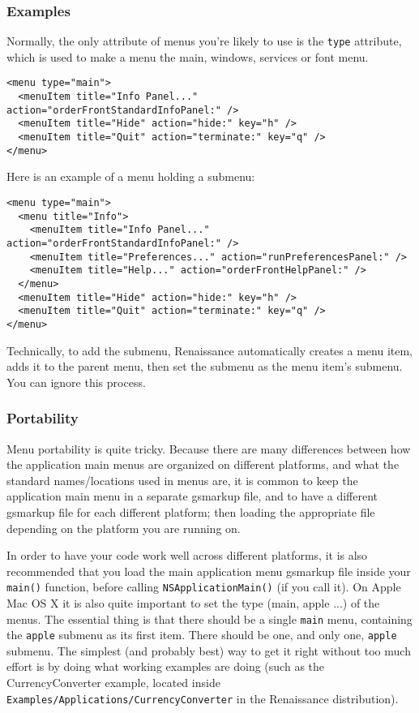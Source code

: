\subsubsection{Examples}
Normally, the only attribute of menus you're likely to use is the 
\texttt{type} attribute, which is used to make a menu the main, windows, 
services or font menu.
\begin{verbatim}
<menu type="main">
  <menuItem title="Info Panel..." action="orderFrontStandardInfoPanel:" />
  <menuItem title="Hide" action="hide:" key="h" />
  <menuItem title="Quit" action="terminate:" key="q" />
</menu>
\end{verbatim}

Here is an example of a menu holding a submenu:
\begin{verbatim}
<menu type="main">
  <menu title="Info">
    <menuItem title="Info Panel..." action="orderFrontStandardInfoPanel:" />
    <menuItem title="Preferences..." action="runPreferencesPanel:" />
    <menuItem title="Help..." action="orderFrontHelpPanel:" />
  </menu>
  <menuItem title="Hide" action="hide:" key="h" />
  <menuItem title="Quit" action="terminate:" key="q" />
</menu>
\end{verbatim}
Technically, to add the submenu, Renaissance automatically creates a
menu item, adds it to the parent menu, then set the submenu as the
menu item's submenu.  You can ignore this process.

\subsubsection{Portability}
Menu portability is quite tricky.  Because there are many differences
between how the application main menus are organized on different
platforms, and what the standard names/locations used in menus are, it
is common to keep the application main menu in a separate gsmarkup
file, and to have a different gsmarkup file for each different
platform; then loading the appropriate file depending on the platform
you are running on.

In order to have your code work well across different platforms, it is
also recommended that you load the main application menu gsmarkup file
inside your \texttt{main()} function, before calling
\texttt{NSApplicationMain()} (if you call it).  On Apple Mac OS X it is
also quite important to set the type (main, apple ...)  of the menus.
The essential thing is that there should be a single \texttt{main}
menu, containing the \texttt{apple} submenu as its first item.  There
should be one, and only one, \texttt{apple} submenu.  The simplest
(and probably best) way to get it right without too much effort is by
doing what working examples are doing (such as the CurrencyConverter
example, located inside
\texttt{Examples/Applications/CurrencyConverter} in the Renaissance
distribution).


